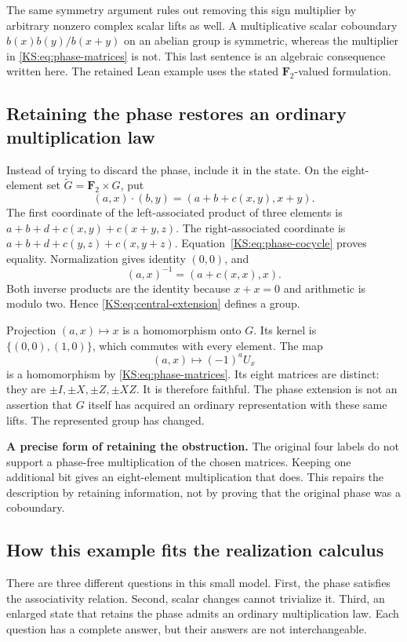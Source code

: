 The same symmetry argument rules out removing this sign multiplier by arbitrary nonzero complex scalar lifts as well. A multiplicative scalar coboundary \(b(x)b(y)/b(x+y)\) on an abelian group is symmetric, whereas the multiplier in \eqref{KS:eq:phase-matrices} is not. This last sentence is an algebraic consequence written here. The retained Lean example uses the stated \(\mathbf F_2\)-valued formulation.

\subsection{Retaining the phase restores an ordinary multiplication law}
Instead of trying to discard the phase, include it in the state. On the eight-element set \(\widetilde G=\mathbf F_2\times G\), put
\begin{equation}\label{KS:eq:central-extension}
 (a,x)\cdot(b,y)=(a+b+c(x,y),x+y).
\end{equation}
The first coordinate of the left-associated product of three elements is
\(a+b+d+c(x,y)+c(x+y,z)\). The right-associated coordinate is
\(a+b+d+c(y,z)+c(x,y+z)\). Equation~\eqref{KS:eq:phase-cocycle} proves equality. Normalization gives identity \((0,0)\), and
\[
 (a,x)^{-1}=(a+c(x,x),x).
\]
Both inverse products are the identity because \(x+x=0\) and arithmetic is modulo two. Hence \eqref{KS:eq:central-extension} defines a group.

Projection \((a,x)\mapsto x\) is a homomorphism onto \(G\). Its kernel is \(\{(0,0),(1,0)\}\), which commutes with every element. The map
\[
 (a,x)\longmapsto(-1)^aU_x
\]
is a homomorphism by \eqref{KS:eq:phase-matrices}. Its eight matrices are distinct: they are \(\pm I,\pm X,\pm Z,\pm XZ\). It is therefore faithful. The phase extension is not an assertion that \(G\) itself has acquired an ordinary representation with these same lifts. The represented group has changed.

\begin{insight}
\textbf{A precise form of retaining the obstruction.} The original four labels do not support a phase-free multiplication of the chosen matrices. Keeping one additional bit gives an eight-element multiplication that does. This repairs the description by retaining information, not by proving that the original phase was a coboundary.
\end{insight}

\subsection{How this example fits the realization calculus}
There are three different questions in this small model. First, the phase satisfies the associativity relation. Second, scalar changes cannot trivialize it. Third, an enlarged state that retains the phase admits an ordinary multiplication law. Each question has a complete answer, but their answers are not interchangeable.

